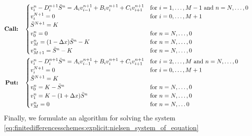 \begin{subequations}
  \label{eq:finitedifferencesschemes:explicit:nielsen_system_of_equation}
  \begin{align}
    \text{\textbf{Call:}} \quad& \begin{cases}
      v^{n}_{i} - D^{n+1}_{i}\bar{S}^n = A_i v^{n+1}_{i-1} + B_{i}v^{n+1}_{i} + C_{i}v^{n+1}_{i+1} & \text{for $i = 1, \dots, M-1$ and $n = N,\dots, 0$}\\
      v^{N+1}_i = 0 & \text{for $i = 0, \dots, M+1$}  \\
      \bar{S}^{N+1} = K \\
      v^{n}_0 = 0 & \text{for $n = N, \dots, 0$} \\ 
      v^{n}_{M} = (1-\Delta{x})\bar{S}^n - K & \text{for $n = N, \dots, 0$} \\
      v^{n}_{M+1} = \bar{S}^n - K  & \text{for $n = N, \dots, 0$}
    \end{cases}\\
    \text{\textbf{Put:}} \quad&  \begin{cases}
      v^{n}_{i} - D^{n+1}_{i}\bar{S}^n = A_i v^{n+1}_{i-1} + B_{i}v^{n+1}_{i} + C_{i}v^{n+1}_{i+1} & \text{for $i = 2, \dots, M$ and $n = N,\dots,0$} \\
      v^{N+1}_i = 0 & \text{for $i = 0, \dots, M+1$} \\ 
      \bar{S}^{N+1} = K \\
      v^{n}_{0} = K - \bar{S}^{n} & \text{for $n = N, \dots, 0$} \\
      v^{n}_{1} =  K - (1+\Delta{x})\bar{S}^{n}  & \text{for $n = N, \dots, 0$} \\
      v^{n}_{M} = 0 & \text{for $n = N, \dots 0$}
    \end{cases}
  \end{align}
\end{subequations}
Finally, we formulate an algorithm for solving the system \eqref{eq:finitedifferencesschemes:explicit:nielsen_system_of_equation}
